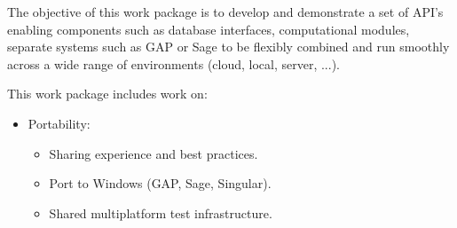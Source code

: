 \addtocounter{wpno}{1}
\begin{Workpackage}{\thewpno}
\WPTitle{\wpname{\thewpno}}

\begin{WPObjectives}
  The objective of this work package is to develop and demonstrate a
  set of API's enabling components such as database interfaces,
  computational modules, separate systems such as GAP or Sage to be
  flexibly combined and run smoothly across a wide range of
  environments (cloud, local, server, ...).
\end{WPObjectives}

\begin{WPDescription}
  This work package includes work on:
  \begin{itemize}
  \item Portability:
    \begin{itemize}
    \item Sharing experience and best practices.
    \item Port to Windows (GAP, Sage, Singular).
    \item Shared multiplatform test infrastructure.
    \end{itemize}


\end{itemize}
\end{WPDescription}
\end{Workpackage}
